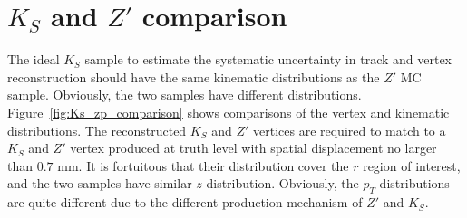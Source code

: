 \section{\texorpdfstring{$K_{S}$}{Ks} and \texorpdfstring{$Z'$}{Z'} comparison}
\label{app:syst_Ks_Zp}

The ideal $K_{S}$ sample to estimate the systematic uncertainty in track and vertex reconstruction should have the same kinematic distributions as the $Z'$ MC sample. Obviously, the two samples have different distributions. Figure~\ref{fig:Ks_zp_comparison} shows comparisons of the vertex and kinematic distributions. The reconstructed $K_{S}$ and $Z'$ vertices are required to match to a $K_{S}$ and $Z'$ vertex produced at truth level with spatial displacement no larger than $0.7$ mm. It is fortuitous that their distribution cover the $r$ region of interest, and the two samples have similar $z$ distribution. Obviously, the $p_{T}$ distributions are quite different due to the different production mechanism of $Z'$ and $K_{S}$.



